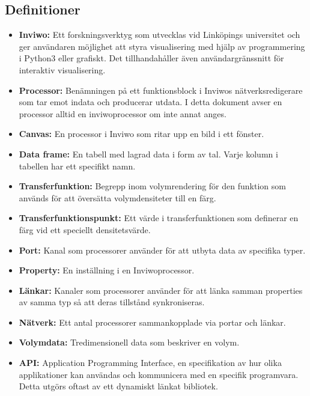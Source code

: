 \subsection{Definitioner}
\begin{itemize}
\setlength\itemsep{0em}
\item \textbf{Inviwo:} Ett forskningsverktyg som utvecklas vid Linköpings universitet och ger användaren möjlighet att styra visualisering med hjälp av programmering i Python3 eller grafiskt. Det tillhandahåller även användargränssnitt för interaktiv visualisering. \cite{Inviwo}

\item \textbf{Processor:} Benämningen på ett funktionsblock i Inviwos nätverksredigerare som tar emot indata och producerar utdata. I detta dokument avser en processor alltid en inviwoprocessor om inte annat anges.

\item \textbf{Canvas:} En processor i Inviwo som ritar upp en bild i ett fönster.

\item \textbf{Data frame:} En tabell med lagrad data i form av tal. Varje kolumn i tabellen har ett specifikt namn.

\item \textbf{Transferfunktion:} Begrepp inom volymrendering för den funktion som används för att översätta volymdensiteter till en färg.

\item \textbf{Transferfunktionspunkt: } Ett värde i transferfunktionen som definerar en färg vid ett speciellt densitetsvärde.

\item \textbf{Port:} Kanal som processorer använder för att utbyta data av specifika typer.

\item \textbf{Property:} En inställning i en Inviwoprocessor.

\item \textbf{Länkar:} Kanaler som processorer använder för att länka samman properties av samma typ så att deras tillstånd synkroniseras.

\item \textbf{Nätverk:} Ett antal processorer sammankopplade via portar och länkar. 

\item \textbf{Volymdata:} Tredimensionell data som beskriver en volym.

\item \textbf{API:} Application Programming Interface, en specifikation av hur olika applikationer kan användas och kommunicera med en specifik programvara. Detta utgörs oftast av ett dynamiskt länkat bibliotek.\cite{API}


\end{itemize}
